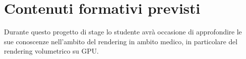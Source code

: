 \section*{Contenuti formativi previsti}
Durante questo progetto di stage lo studente avrà occasione di approfondire le sue conoscenze nell'ambito del rendering in ambito medico, in particolare del rendering volumetrico su GPU.
\newpage